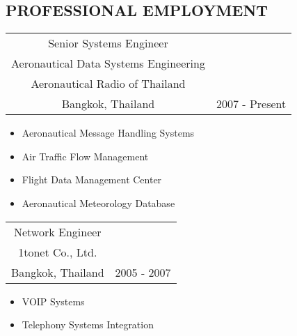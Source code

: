 \documentclass[margin]{res}
\begin{document}
\begin{resume}
\section{PROFESSIONAL EMPLOYMENT}      
                  \begin{tabular}[t]{c c} %
                  Senior Systems Engineer \\ Aeronautical Data Systems Engineering\\ Aeronautical Radio of Thailand \\ Bangkok, Thailand &  2007 - Present
                  \end{tabular}	
                   \begin{itemize} %
                    \item Aeronautical Message Handling Systems
                    \item Air Traffic Flow Management
                    \item Flight Data Management Center
                    \item Aeronautical Meteorology Database
		   \end{itemize} 
		 \begin{tabular}[t]{c c}
                  Network Engineer \\ 1tonet Co., Ltd. \\ Bangkok, Thailand &  2005 - 2007 
                 \end{tabular}	
		  \begin{itemize}
                   \item VOIP Systems
                   \item Telephony Systems Integration
                  \end{itemize}
                

\end{resume}
\end{document}
